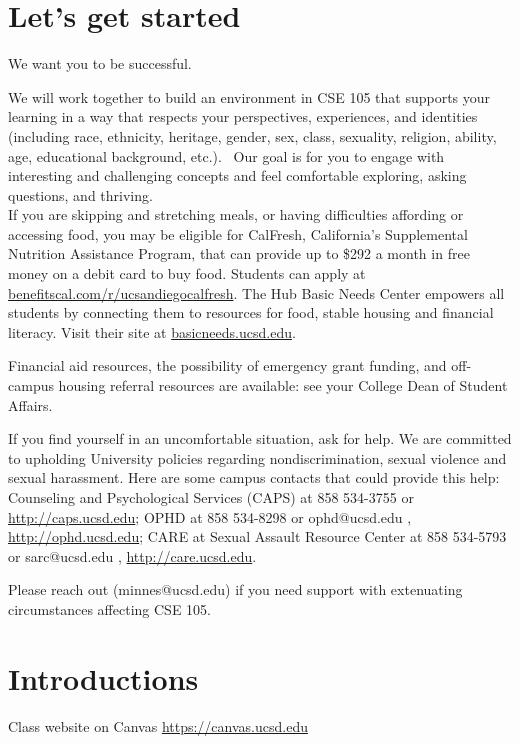 

\section*{Let's get started}

We want you to be successful. 

We will work together to build an 
environment in CSE 105 that supports your learning
in a way that respects your
perspectives, experiences, and identities (including race, ethnicity, heritage, gender, sex, 
class, sexuality, religion, ability, age, educational background, etc.).  
Our goal is for you to  engage
with interesting and challenging concepts and 
feel comfortable exploring, asking questions, and thriving.\\

If you are skipping and stretching meals, or having difficulties affording or accessing food, you may be eligible for CalFresh, California's Supplemental Nutrition Assistance Program, that can provide up to \$292 a month in free money on a debit card to buy food. Students can apply at \url{benefitscal.com/r/ucsandiegocalfresh}.
The Hub Basic Needs Center empowers all students by connecting them to resources for food, stable housing and financial literacy. Visit their site at \url{basicneeds.ucsd.edu}.

Financial aid resources, the possibility of emergency grant funding, and off-campus housing referral 
resources are available: see your College Dean of Student Affairs.

If you find yourself in an uncomfortable situation, ask for help. 
We are committed to upholding University policies regarding nondiscrimination, sexual violence and sexual harassment.
Here are some campus contacts that could provide this help: 
Counseling and Psychological Services (CAPS) at 858 534-3755 or \href{http://caps.ucsd.edu}{http://caps.ucsd.edu}; 
OPHD at 858 534-8298 or ophd@ucsd.edu , \href{http://ophd.ucsd.edu}{http://ophd.ucsd.edu};
CARE at Sexual Assault Resource Center at 858 534-5793 or sarc@ucsd.edu , \href{http://care.ucsd.edu}{http://care.ucsd.edu}.


Please reach out (minnes@ucsd.edu) if you need support with extenuating circumstances affecting CSE 105.

\vfill

\section*{Introductions}
Class website on Canvas \href{https://canvas.ucsd.edu/}{https://canvas.ucsd.edu}


